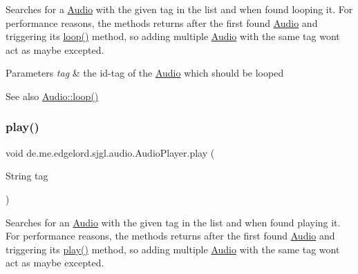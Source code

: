 Searches for a {\ttfamily \mbox{\hyperlink{classde_1_1me_1_1edgelord_1_1sjgl_1_1audio_1_1_audio}{Audio}}} with the given tag in the list and when found looping it. For performance reasons, the methods returns after the first found {\ttfamily \mbox{\hyperlink{classde_1_1me_1_1edgelord_1_1sjgl_1_1audio_1_1_audio}{Audio}}} and triggering its {\ttfamily \mbox{\hyperlink{classde_1_1me_1_1edgelord_1_1sjgl_1_1audio_1_1_audio_player_a4773c3bc2054fcb5f7892ebf330c68b8}{loop()}}} method, so adding multiple {\ttfamily \mbox{\hyperlink{classde_1_1me_1_1edgelord_1_1sjgl_1_1audio_1_1_audio}{Audio}}} with the same tag won\textquotesingle{}t act as maybe excepted.


\begin{DoxyParams}{Parameters}
{\em tag} & the id-\/tag of the {\ttfamily \mbox{\hyperlink{classde_1_1me_1_1edgelord_1_1sjgl_1_1audio_1_1_audio}{Audio}}} which should be looped\\
\hline
\end{DoxyParams}
\begin{DoxySeeAlso}{See also}
\mbox{\hyperlink{classde_1_1me_1_1edgelord_1_1sjgl_1_1audio_1_1_audio_a654692b8ee1f0d298af938b2c76e6a54}{Audio\+::loop()}} 
\end{DoxySeeAlso}
\mbox{\label{classde_1_1me_1_1edgelord_1_1sjgl_1_1audio_1_1_audio_player_aecce0a524758259586949e7fb0c477d6}} 
\subsubsection{\texorpdfstring{play()}{play()}}
{\footnotesize\ttfamily void de.\+me.\+edgelord.\+sjgl.\+audio.\+Audio\+Player.\+play (\begin{DoxyParamCaption}\item[{String}]{tag }\end{DoxyParamCaption})}

Searches for an {\ttfamily \mbox{\hyperlink{classde_1_1me_1_1edgelord_1_1sjgl_1_1audio_1_1_audio}{Audio}}} with the given tag in the list and when found playing it. For performance reasons, the methods returns after the first found {\ttfamily \mbox{\hyperlink{classde_1_1me_1_1edgelord_1_1sjgl_1_1audio_1_1_audio}{Audio}}} and triggering its {\ttfamily \mbox{\hyperlink{classde_1_1me_1_1edgelord_1_1sjgl_1_1audio_1_1_audio_player_aecce0a524758259586949e7fb0c477d6}{play()}}} method, so adding multiple {\ttfamily \mbox{\hyperlink{classde_1_1me_1_1edgelord_1_1sjgl_1_1audio_1_1_audio}{Audio}}} with the same tag won\textquotesingle{}t act as maybe excepted.



